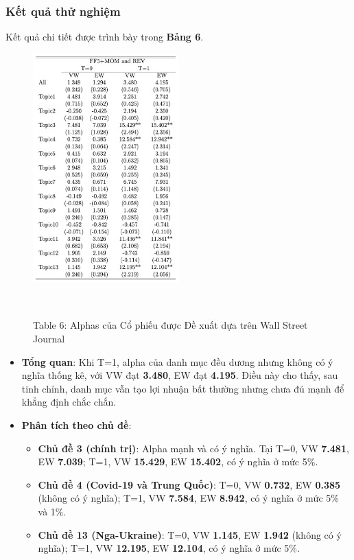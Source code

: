 \documentclass[a4paper,12pt]{article}
\begin{document}
\subsubsection{Kết quả thử nghiệm}
Kết quả chi tiết được trình bày trong \textbf{Bảng 6}.
\begin{figure}[H]
    \centering
    \includegraphics[width=0.5\textwidth]{table/tab6.png}
    \caption*{Table 6: Alphas của Cổ phiếu được Đề xuất dựa trên Wall Street Journal}
    \
\end{figure}
\begin{itemize}
    \item \textbf{Tổng quan}: Khi T=1, alpha của danh mục đều dương nhưng không có ý nghĩa thống kê, với VW đạt \textbf{3.480}, EW đạt \textbf{4.195}. Điều này cho thấy, sau tinh chỉnh, danh mục vẫn tạo lợi nhuận bất thường nhưng chưa đủ mạnh để khẳng định chắc chắn.
    \item \textbf{Phân tích theo chủ đề}:
    \begin{itemize}
        \item \textbf{Chủ đề 3 (chính trị)}: Alpha mạnh và có ý nghĩa. Tại T=0, VW \textbf{7.481}, EW \textbf{7.039}; T=1, VW \textbf{15.429}, EW \textbf{15.402}, có ý nghĩa ở mức 5\%.
        \item \textbf{Chủ đề 4 (Covid-19 và Trung Quốc)}: T=0, VW \textbf{0.732}, EW \textbf{0.385} (không có ý nghĩa); T=1, VW \textbf{7.584}, EW \textbf{8.942}, có ý nghĩa ở mức 5\% và 1\%.
        \item \textbf{Chủ đề 13 (Nga-Ukraine)}: T=0, VW \textbf{1.145}, EW \textbf{1.942} (không có ý nghĩa); T=1, VW \textbf{12.195}, EW \textbf{12.104}, có ý nghĩa ở mức 5\%.
    \end{itemize}
\end{itemize}
\end{document}
